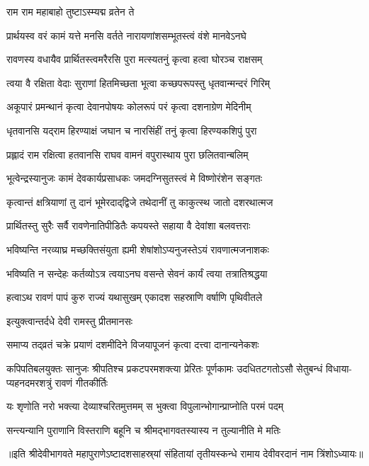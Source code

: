 

\onelineshloka
{राम राम महाबाहो तुष्टाऽस्म्यद्म व्रतेन ते}%

\twolineshloka
{प्रार्थयस्व वरं कामं यत्ते मनसि वर्तते}
{नारायणांशसम्भूतस्त्वं वंशे मानवेऽनघे}%

\twolineshloka
{रावणस्य वधायैव प्रार्थितस्त्वमरैरसि}
{पुरा मत्स्यतनुं कृत्वा हत्वा घोरञ्च राक्षसम्}%

\twolineshloka
{त्वया वै रक्षिता वेदाः सुराणां हितमिच्छता}
{भूत्वा कच्छपरूपस्तु धृतवान्मन्दरं गिरिम्}%

\twolineshloka
{अकूपारं प्रमन्थानं कृत्वा देवानपोषयः}
{कोलरूपं परं कृत्वा दशनाग्रेण मेदिनीम्}%

\twolineshloka
{धृतवानसि यद्‌राम हिरण्याक्षं जघान च}
{नारसिंहीं तनुं कृत्वा हिरण्यकशिपुं पुरा}%

\twolineshloka
{प्रह्लादं राम रक्षित्वा हतवानसि राघव}
{वामनं वपुरास्थाय पुरा छलितवान्बलिम्}%

\twolineshloka
{भूत्वेन्द्रस्यानुजः कामं देवकार्यप्रसाधकः}
{जमदग्निसुतस्त्वं मे विष्णोरंशेन सङ्गतः}%

\twolineshloka
{कृत्वान्तं क्षत्रियाणां तु दानं भूमेरदाद्‌द्विजे}
{तथेदानीं तु काकुत्स्थ जातो दशरथात्मज}%

\twolineshloka
{प्रार्थितस्तु सुरैः सर्वै रावणेनातिपीडितैः}
{कपयस्ते सहाया वै देवांशा बलवत्तराः}%

\twolineshloka
{भविष्यन्ति नरव्याघ्र मच्छक्तिसंयुता ह्यमी}
{शेषांशोऽप्यनुजस्तेऽयं रावणात्मजनाशकः}%

\twolineshloka
{भविष्यति न सन्देहः कर्तव्योऽत्र त्वयाऽनघ}
{वसन्ते सेवनं कार्यं त्वया तत्रातिश्रद्धया}%

\twolineshloka
{हत्वाऽथ रावणं पापं कुरु राज्यं यथासुखम्}
{एकादश सहस्राणि वर्षाणि पृथिवीतले}%



\onelineshloka
{इत्युक्त्वान्तर्दधे देवी रामस्तु प्रीतमानसः}%

\twolineshloka
{समाप्य तद्‌व्रतं चक्रे प्रयाणं दशमीदिने}
{विजयापूजनं कृत्वा दत्त्वा दानान्यनेकशः}%

\fourlineindentedshloka
{कपिपतिबलयुक्तः सानुजः श्रीपतिश्च}
{प्रकटपरमशक्त्या प्रेरितः पूर्णकामः}
{उदधितटगतोऽसौ सेतुबन्धं विधाया-}
{प्यहनदमरशत्रुं रावणं गीतकीर्तिः}%

\twolineshloka
{यः शृणोति नरो भक्त्या देव्याश्चरितमुत्तमम्}
{स भुक्त्वा विपुलान्भोगान्प्राप्नोति परमं पदम्}%

\twolineshloka
{सन्त्यन्यानि पुराणानि विस्तराणि बहूनि च}
{श्रीमद्‌भागवतस्यास्य न तुल्यानीति मे मतिः}%

॥इति श्रीदेवीभागवते महापुराणेऽष्टादशसाहस्र्यां संहितायां तृतीयस्कन्धे रामाय देवीवरदानं नाम त्रिंशोऽध्यायः॥

\closesection
